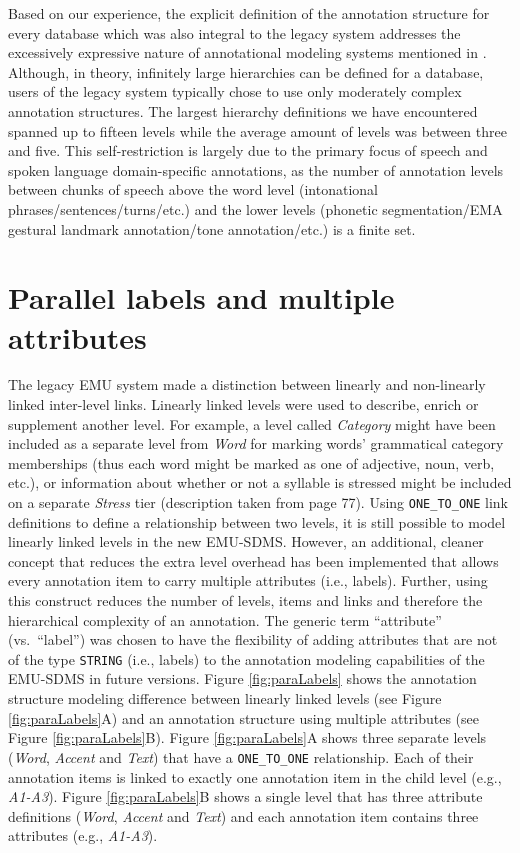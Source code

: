\documentclass[
]{book}
\begin{document}
Based on our experience, the explicit definition of the annotation structure for every database which was also integral to the legacy system addresses the excessively expressive nature of annotational modeling systems mentioned in \citet{bird:sc2001a}. Although, in theory, infinitely large hierarchies can be defined for a database, users of the legacy system typically chose to use only moderately complex annotation structures. The largest hierarchy definitions we have encountered spanned up to fifteen levels while the average amount of levels was between three and five. This self-restriction is largely due to the primary focus of speech and spoken language domain-specific annotations, as the number of annotation levels between chunks of speech above the word level (intonational phrases/sentences/turns/etc.) and the lower levels (phonetic segmentation/EMA gestural landmark annotation/tone annotation/etc.) is a finite set.

\hypertarget{parallel-labels-and-multiple-attributes}{%
\section{Parallel labels and multiple attributes}\label{parallel-labels-and-multiple-attributes}}

The legacy EMU system made a distinction between linearly and non-linearly linked inter-level links. Linearly linked levels were used to describe, enrich or supplement another level. For example, a level called \emph{Category} might have been included as a separate level from \emph{Word} for marking words' grammatical category memberships (thus each word might be marked as one of adjective, noun, verb, etc.), or information about whether or not a syllable is stressed might be included on a separate \emph{Stress} tier (description taken from \citet{harrington:2010a} page 77). Using \texttt{ONE\_TO\_ONE} link definitions to define a relationship between two levels, it is still possible to model linearly linked levels in the new EMU-SDMS. However, an additional, cleaner concept that reduces the extra level overhead has been implemented that allows every annotation item to carry multiple attributes (i.e., labels). Further, using this construct reduces the number of levels, items and links and therefore the hierarchical complexity of an annotation. The generic term ``attribute'' (vs.~``label'') was chosen to have the flexibility of adding attributes that are not of the type \texttt{STRING} (i.e., labels) to the annotation modeling capabilities of the EMU-SDMS in future versions. Figure \ref{fig:paraLabels} shows the annotation structure modeling difference between linearly linked levels (see Figure \ref{fig:paraLabels}A) and an annotation structure using multiple attributes (see Figure \ref{fig:paraLabels}B). Figure \ref{fig:paraLabels}A shows three separate levels (\emph{Word}, \emph{Accent} and \emph{Text}) that have a \texttt{ONE\_TO\_ONE} relationship. Each of their annotation items is linked to exactly one annotation item in the child level (e.g., \emph{A1-A3}). Figure \ref{fig:paraLabels}B shows a single level that has three attribute definitions (\emph{Word}, \emph{Accent} and \emph{Text}) and each annotation item contains three attributes (e.g., \emph{A1-A3}).
\end{document}
